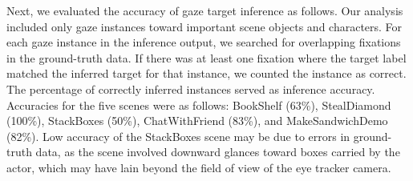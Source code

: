 Next, we evaluated the accuracy of gaze target inference as follows. Our analysis included only gaze instances toward important scene objects and characters. For each gaze instance in the inference output, we searched for overlapping fixations in the ground-truth data. If there was at least one fixation where the target label matched the inferred target for that instance, we counted the instance as correct. The percentage of correctly inferred instances served as inference accuracy. Accuracies for the five scenes were as follows: BookShelf (63\%), StealDiamond (100\%), StackBoxes (50\%), ChatWithFriend (83\%), and MakeSandwichDemo (82\%). Low accuracy of the StackBoxes scene may be due to errors in ground-truth data, as the scene involved downward glances toward boxes carried by the actor, which may have lain beyond the field of view of the eye tracker camera.
